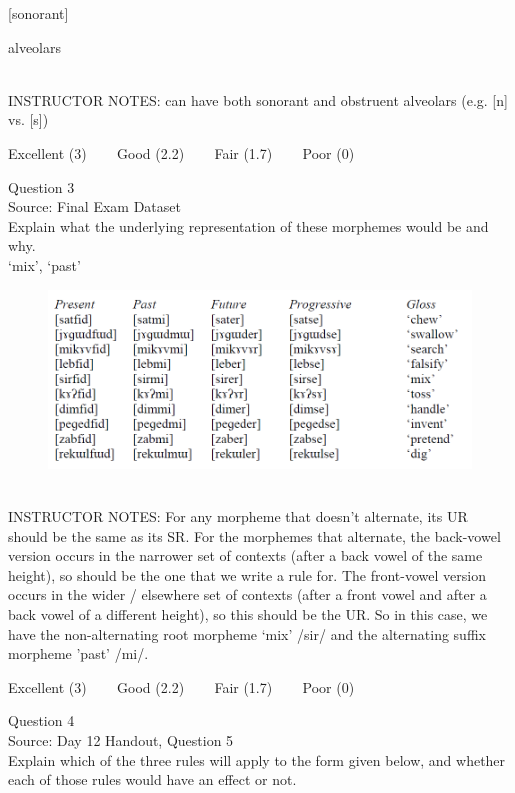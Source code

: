 \documentclass[12pt]{article}
\begin{document}
{[sonorant]}

alveolars


~\\
INSTRUCTOR NOTES: can have both sonorant and obstruent alveolars (e.g. [n] vs. [s])


\vfill
Excellent (3) ~~~ Good (2.2) ~~~ Fair (1.7) ~~~ Poor (0)
\newpage

{\large Question 3}\\

Source: Final Exam Dataset\\

Explain what the underlying representation of these morphemes would be and why.\\

`mix', `past'

\begin{figure}[H]
\includegraphics{../images/final_dataset.png}
\end{figure}

~\\
INSTRUCTOR NOTES: For any morpheme that doesn’t alternate, its UR should be the same as its SR.  For the morphemes that alternate, the back-vowel version occurs in the narrower set of contexts (after a back vowel of the same height), so should be the one that we write a rule for. The front-vowel version occurs in the wider / elsewhere set of contexts (after a front vowel and after a back vowel of a different height), so this should be the UR. So in this case, we have the non-alternating root morpheme ‘mix’ /sir/ and the alternating suffix morpheme 'past' /mi/.


\vfill
Excellent (3) ~~~ Good (2.2) ~~~ Fair (1.7) ~~~ Poor (0)
\newpage

{\large Question 4}\\

Source: Day 12 Handout, Question 5\\

Explain which of the three rules will apply to the form given below, and whether each of those rules would have an effect or not.\\
\end{document}
